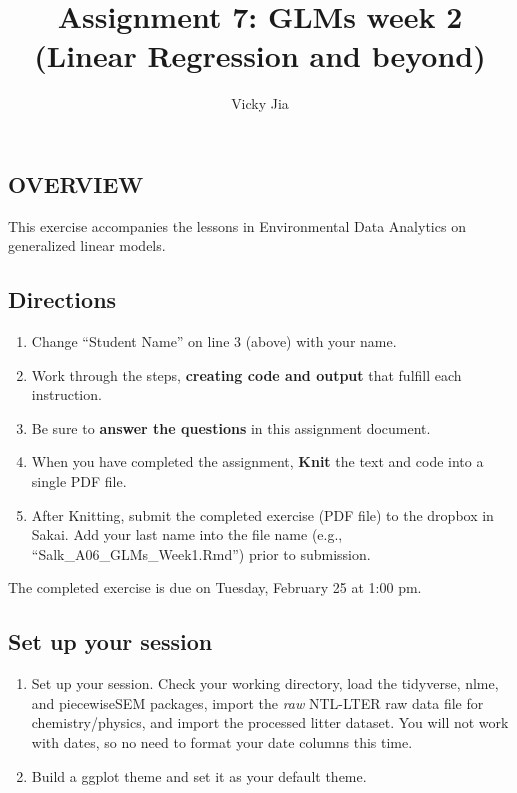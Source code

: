 \documentclass[]{article}
\title{Assignment 7: GLMs week 2 (Linear Regression and beyond)}
\author{Vicky Jia}
\date{}
\providecommand{\tightlist}{%
  \setlength{\itemsep}{0pt}\setlength{\parskip}{0pt}}
\begin{document}
\maketitle

\subsection{OVERVIEW}\label{overview}

This exercise accompanies the lessons in Environmental Data Analytics on
generalized linear models.

\subsection{Directions}\label{directions}

\begin{enumerate}
\def\labelenumi{\arabic{enumi}.}
\tightlist
\item
  Change ``Student Name'' on line 3 (above) with your name.
\item
  Work through the steps, \textbf{creating code and output} that fulfill
  each instruction.
\item
  Be sure to \textbf{answer the questions} in this assignment document.
\item
  When you have completed the assignment, \textbf{Knit} the text and
  code into a single PDF file.
\item
  After Knitting, submit the completed exercise (PDF file) to the
  dropbox in Sakai. Add your last name into the file name (e.g.,
  ``Salk\_A06\_GLMs\_Week1.Rmd'') prior to submission.
\end{enumerate}

The completed exercise is due on Tuesday, February 25 at 1:00 pm.

\subsection{Set up your session}\label{set-up-your-session}

\begin{enumerate}
\def\labelenumi{\arabic{enumi}.}
\item
  Set up your session. Check your working directory, load the tidyverse,
  nlme, and piecewiseSEM packages, import the \emph{raw} NTL-LTER raw
  data file for chemistry/physics, and import the processed litter
  dataset. You will not work with dates, so no need to format your date
  columns this time.
\item
  Build a ggplot theme and set it as your default theme.
\end{enumerate}
\end{document}
